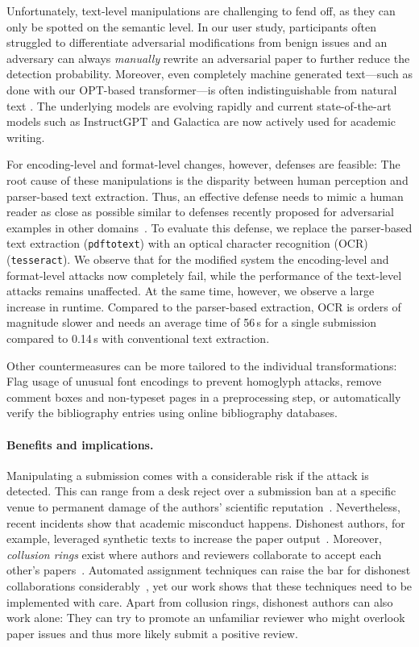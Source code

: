 \documentclass[letterpaper,twocolumn,10pt]{article}
\begin{document}
Unfortunately, text-level manipulations are challenging to fend off, as they can only be spotted on the semantic level. In our user study, participants often struggled to differentiate adversarial modifications from benign issues and an adversary can always \emph{manually} rewrite an adversarial paper to further reduce the detection probability.
Moreover, even completely machine generated text---such as done with our OPT-based transformer---is often indistinguishable from natural text \cite{brown-20-language, mink-22-deepphish}. The underlying models are evolving rapidly and current state-of-the-art models such as 
InstructGPT \cite{ouyang-22-instructgpt} 
and Galactica \cite{taylor-22-galactica} 
are now actively used for academic writing.

For encoding-level and format-level changes, however, defenses are feasible: The root cause of these manipulations is the disparity between human perception and parser-based text extraction. Thus, an effective defense needs to mimic a human reader as close as possible similar to defenses recently proposed for adversarial examples in other domains~\cite[e.g.][]{eisenhofer-21-dompteur}. 
To evaluate this defense, we replace the parser-based text extraction (\texttt{pdftotext}) with an optical character recognition (OCR) (\texttt{tesseract}). We observe that for the modified system the encoding-level and format-level attacks now completely fail, while the performance of the text-level attacks remains unaffected. At the same time, however, we observe a large increase in runtime. Compared to the parser-based extraction, OCR is orders of magnitude slower and needs an average time of 56\,s for a single submission compared to 0.14\,s with conventional text extraction.

Other countermeasures can be more tailored to the individual transformations: Flag usage of unusual font encodings to prevent homoglyph attacks, remove comment boxes and non-typeset pages in a preprocessing step, or automatically verify the bibliography entries using online bibliography databases.


\paragraph{Benefits and implications.}
Manipulating a submission comes with a considerable risk if the attack is detected. This can range from a desk reject over a submission ban at a specific venue to permanent damage of the authors' scientific reputation~\cite{shah-22-challenges}. 
Nevertheless, recent incidents show that academic misconduct happens. Dishonest authors, for example, leveraged synthetic texts to increase the paper output~\cite{cabanac-21-tortured}. Moreover, \emph{collusion rings} exist where authors and reviewers collaborate to accept each other's papers~\cite{littman-21-collusion}. 
Automated assignment techniques can raise the bar for dishonest collaborations considerably~\cite{leyton-22-matching}, yet our work shows that these techniques need to be implemented with care. 
Apart from collusion rings, dishonest authors can also work alone: They can try to promote an unfamiliar reviewer who might overlook paper issues and thus more likely submit a positive review. 
\end{document}
